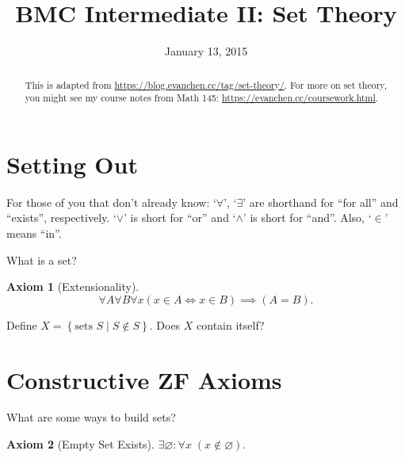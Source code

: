 \documentclass[11pt]{scrartcl}
\theoremstyle{definition}
\newtheorem{axiom}{Axiom}
\begin{document}
\title{BMC Intermediate II: Set Theory}
\date{January 13, 2015}
\maketitle

\begin{abstract}
  This is adapted from \url{https://blog.evanchen.cc/tag/set-theory/}.
  For more on set theory, you might see my course notes from Math 145: \url{https://evanchen.cc/coursework.html}.
\end{abstract}

\section{Setting Out}
For those of you that don't already know:
`$\forall$', `$\exists$' are shorthand for ``for all'' and ``exists'',
respectively.
`$\lor$' is short for ``or'' and `$\land$' is short for ``and''.
Also, `$\in$' means ``in''.

\begin{ques}
  What is a set?
\end{ques}

\begin{axiom}
  [Extensionality]
  \[ \forall A \forall B \forall x
    \left( x \in A \iff x \in B \right) \implies (A = B). \]
\end{axiom}

\begin{ques}
  Define $X = \left\{ \text{sets $S$} \mid S \notin S \right\}$.
  Does $X$ contain itself?
\end{ques}


\section{Constructive ZF Axioms}
\begin{ques}
  What are some ways to build sets?
\end{ques}

\begin{axiom}
  [Empty Set Exists] $\exists \varnothing : \forall x \; (x \notin \varnothing)$.
\end{axiom}
\end{document}
